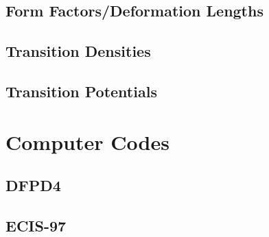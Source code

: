 \subsection{Form Factors/Deformation Lengths}
\label{ssec:nuc-scat-gr-forms-defs}
\subsection{Transition Densities}
\label{ssec:nuc-scat-gr-trans-dens}
\subsection{Transition Potentials}
\label{ssec:nuc-scat-gr-trans-pot}

\section{Computer Codes}
\label{sec:nuc-scat-comp}
\subsection{DFPD4}
\label{sec:nuc-scat-dfpd4}
\subsection{ECIS-97}
\label{sec:nuc-scat-ecis}
